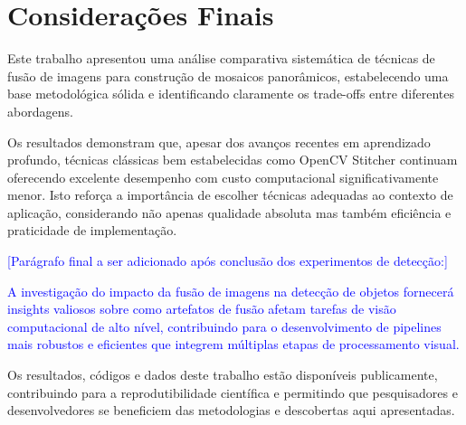 \section{Considerações Finais}

Este trabalho apresentou uma análise comparativa sistemática de técnicas de fusão de imagens para construção de mosaicos panorâmicos, estabelecendo uma base metodológica sólida e identificando claramente os trade-offs entre diferentes abordagens.

Os resultados demonstram que, apesar dos avanços recentes em aprendizado profundo, técnicas clássicas bem estabelecidas como OpenCV Stitcher continuam oferecendo excelente desempenho com custo computacional significativamente menor. Isto reforça a importância de escolher técnicas adequadas ao contexto de aplicação, considerando não apenas qualidade absoluta mas também eficiência e praticidade de implementação.

\textcolor{blue}{[Parágrafo final a ser adicionado após conclusão dos experimentos de detecção:]}

\textcolor{blue}{A investigação do impacto da fusão de imagens na detecção de objetos fornecerá insights valiosos sobre como artefatos de fusão afetam tarefas de visão computacional de alto nível, contribuindo para o desenvolvimento de pipelines mais robustos e eficientes que integrem múltiplas etapas de processamento visual.}

Os resultados, códigos e dados deste trabalho estão disponíveis publicamente, contribuindo para a reprodutibilidade científica e permitindo que pesquisadores e desenvolvedores se beneficiem das metodologias e descobertas aqui apresentadas.
